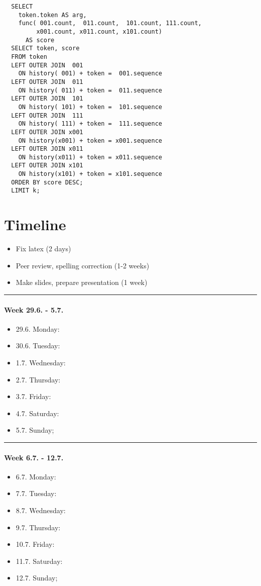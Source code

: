 \begin{lstlisting}
  SELECT
    token.token AS arg,
    func( 001.count,  011.count,  101.count, 111.count,
         x001.count, x011.count, x101.count)
      AS score
  SELECT token, score
  FROM token
  LEFT OUTER JOIN  001
    ON history( 001) + token =  001.sequence
  LEFT OUTER JOIN  011
    ON history( 011) + token =  011.sequence
  LEFT OUTER JOIN  101
    ON history( 101) + token =  101.sequence
  LEFT OUTER JOIN  111
    ON history( 111) + token =  111.sequence
  LEFT OUTER JOIN x001
    ON history(x001) + token = x001.sequence
  LEFT OUTER JOIN x011
    ON history(x011) + token = x011.sequence
  LEFT OUTER JOIN x101
    ON history(x101) + token = x101.sequence
  ORDER BY score DESC;
  LIMIT k;
\end{lstlisting}


\chapter{Timeline}

\begin{itemize}
  \item Fix latex (2 days)
  \item Peer review, spelling correction (1-2 weeks)
  \item Make slides, prepare presentation (1 week)
\end{itemize}

\clearpage
\hrule
\subsubsection*{Week 29.6. - 5.7.}
\begin{itemize}
  \item 29.6. Monday:
  \item 30.6. Tuesday:
  \item  1.7. Wednesday:
  \item  2.7. Thursday:
  \item  3.7. Friday:
  \item  4.7. Saturday:
  \item  5.7. Sunday;
\end{itemize}

\hrule
\subsubsection*{Week 6.7. - 12.7.}
\begin{itemize}
  \item  6.7. Monday:
  \item  7.7. Tuesday:
  \item  8.7. Wednesday:
  \item  9.7. Thursday:
  \item 10.7. Friday:
  \item 11.7. Saturday:
  \item 12.7. Sunday;
\end{itemize}


